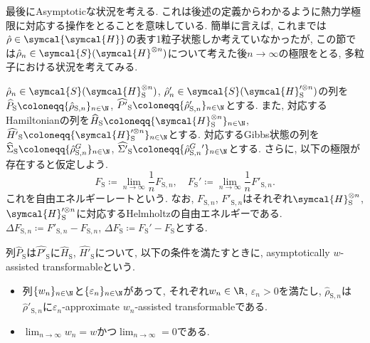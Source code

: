 

最後にAsymptoticな状況を考える. 
これは後述の定義からわかるように熱力学極限に対応する操作をとることを意味している. 
簡単に言えば, これまでは$\hat{\rho}\in\symcal{\symcal{H}}$の表す1粒子状態しか考えていなかったが, この節では$\hat{\rho}_n\in\symcal{S}(\symcal{H}^{\otimes n})$について考えた後$n\to\infty$の極限をとる, 多粒子における状況を考えてみる.

$\hat{\rho}_n\in\symcal{S}(\symcal{H}_{\text{S}}^{\otimes n})$, $\hat{\rho}_n'\in\symcal{S}(\symcal{H}_{\text{S}}'^{\otimes n})$の列を$\widehat{P}_{\text{S}}\coloneqq \{\hat{\rho}_{\text{S}, n}\}_{n\in\N}$, $\widehat{P'}_{\text{S}}\coloneqq \{\hat{\rho}'_{\text{S}, n}\}_{n\in\N}$とする. 
また, 対応するHamiltonianの列を$\widehat{H}_{\text{S}}\coloneqq \{\symcal{H}_{\text{S}}^{\otimes n}\}_{n\in\N}$, $\widehat{H'}_{\text{S}}\coloneqq \{\symcal{H}_{\text{S}}'^{\otimes n}\}_{n\in\N}$とする. 
対応するGibbs状態の列を$\widehat{\Sigma}_{\text{S}}\coloneqq \{\hat{\rho}^{G}_{\text{S}, n}\}_{n\in\N}$, $\widehat{\Sigma '}_{\text{S}}\coloneqq \{\hat{\rho}^{G}_{\text{S}, n}{}'\}_{n\in\N}$とする. 
さらに, 以下の極限が存在すると仮定しよう. 
\begin{equation}
  F_{\text{S}}\coloneqq\lim_{n\to\infty}\frac{1}{n}F_{\text{S}, n}, \quad F_{\text{S}}'\coloneqq\lim_{n\to\infty}\frac{1}{n}F'_{\text{S}, n}. 
\end{equation}
これを自由エネルギーレートという. 
なお, $F_{\text{S}, n}$, $F'_{\text{S}, n}$はそれぞれ$\symcal{H}_{\text{S}}^{\otimes n}$, $\symcal{H}_{\text{S}}'^{\otimes n}$に対応するHelmholtzの自由エネルギーである. 
$\Delta F_{\text{S}, n}\coloneqq F'_{\text{S}, n}-F_{\text{S}, n}$, $\Delta F_{\text{S}}\coloneqq F_{\text{S}}'-F_{\text{S}}$とする. 

\begin{mydfn}
  列$\widehat{P}_{\text{S}}$は$\widehat{P'}_{\text{S}}$に$\widehat{H}_{\text{S}}$, $\widehat{H'}_{\text{S}}$について, 以下の条件を満たすときに, asymptotically $w$-assisted transformableという. 
  \begin{itemize}
    \item 列$\{w_n\}_{n\in\N}$と$\{\varepsilon_n\}_{n\in\N}$があって, それぞれ$w_n\in\R$, $\varepsilon_n>0$を満たし, $\hat{\rho}_{\text{S}, n}$は$\hat{\rho}'_{\text{S}, n}$に$\varepsilon_n$-approximate $w_n$-assisted transformableである. 
    \item $\lim_{n\to\infty}w_n=w$かつ$\lim_{n\to\infty}=0$である. 
  \end{itemize}
\end{mydfn}

